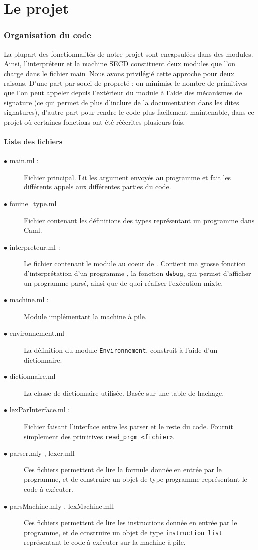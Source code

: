 \part{Le projet}

\section{Organisation du code}

La plupart des fonctionnalités de notre projet sont encapsulées dans des modules. Ainsi, l'interpréteur \fouine et la machine SECD constituent deux modules que l'on charge dans le fichier main. Nous avons privilégié cette approche pour deux raisons. D'une part par souci de propreté : on minimise le nombre de primitives que l'on peut appeler depuis l'extérieur du module à l'aide des mécanismes de signature (ce qui permet de plus d'inclure de la documentation dans les dites signatures), d'autre part pour rendre le code plus facilement maintenable, dans ce projet où certaines fonctions ont été réécrites plusieurs fois.

\subsection{Liste des fichiers}

\begin{description}
 \item[$\bullet$ main.ml :] Fichier principal. Lit les argument envoyés au programme et fait les différents appels aux différentes parties du code.
 \item[$\bullet$ fouine\_type.ml] Fichier contenant les définitions des types représentant un programme \fouine dans Caml.
 \item[$\bullet$ interpreteur.ml :] Le fichier contenant le module au coeur de \fouine. Contient ma grosse fonction d'interprétation d'un programme \fouine, la fonction \texttt{debug}, qui permet d'afficher un programme \fouine parsé, ainsi que de quoi réaliser l'exécution mixte.
 \item[$\bullet$ machine.ml :] Module implémentant la machine à pile.
 \item[$\bullet$ environnement.ml] La définition du module \texttt{Environnement}, construit à l'aide d'un dictionnaire.
 \item[$\bullet$ dictionnaire.ml] La classe de dictionnaire utilisée. Basée sur une table de hachage.
 \item[$\bullet$ lexParInterface.ml :] Fichier faisant l'interface entre les parser et le reste du code. Fournit simplement des primitives \texttt{read\_prgm <fichier>}.
 \item[$\bullet$ parser.mly , lexer.mll] Ces fichiers permettent de lire la formule donnée en entrée par le programme, et de construire un objet de type programme représentant le code à exécuter.
 \item[$\bullet$ parsMachine.mly , lexMachine.mll] Ces fichiers permettent de lire les instructions donnée en entrée par le programme, et de construire un objet de type \texttt{instruction list} représentant le code à exécuter sur la machine à pile.
\end{description}

